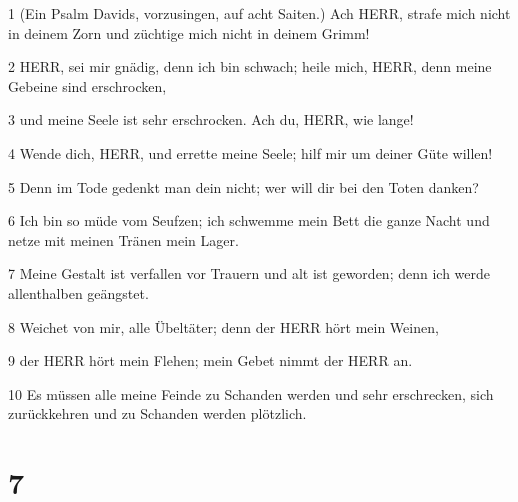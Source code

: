\par 1 (Ein Psalm Davids, vorzusingen, auf acht Saiten.) Ach HERR, strafe mich nicht in deinem Zorn und züchtige mich nicht in deinem Grimm!
\par 2 HERR, sei mir gnädig, denn ich bin schwach; heile mich, HERR, denn meine Gebeine sind erschrocken,
\par 3 und meine Seele ist sehr erschrocken. Ach du, HERR, wie lange!
\par 4 Wende dich, HERR, und errette meine Seele; hilf mir um deiner Güte willen!
\par 5 Denn im Tode gedenkt man dein nicht; wer will dir bei den Toten danken?
\par 6 Ich bin so müde vom Seufzen; ich schwemme mein Bett die ganze Nacht und netze mit meinen Tränen mein Lager.
\par 7 Meine Gestalt ist verfallen vor Trauern und alt ist geworden; denn ich werde allenthalben geängstet.
\par 8 Weichet von mir, alle Übeltäter; denn der HERR hört mein Weinen,
\par 9 der HERR hört mein Flehen; mein Gebet nimmt der HERR an.
\par 10 Es müssen alle meine Feinde zu Schanden werden und sehr erschrecken, sich zurückkehren und zu Schanden werden plötzlich.

\chapter{7}

